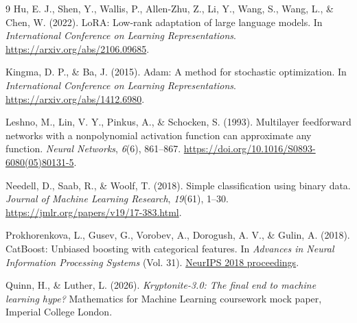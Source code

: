 \documentclass{article}
\begin{document}
\begin{thebibliography}{9}
Hu, E. J., Shen, Y., Wallis, P., Allen-Zhu, Z., Li, Y., Wang, S., Wang, L., \& Chen, W. (2022).
LoRA: Low-rank adaptation of large language models.
In \emph{International Conference on Learning Representations}.
\url{https://arxiv.org/abs/2106.09685}.

Kingma, D. P., \& Ba, J. (2015).
Adam: A method for stochastic optimization.
In \emph{International Conference on Learning Representations}.
\url{https://arxiv.org/abs/1412.6980}.

\newpage
{}
Leshno, M., Lin, V. Y., Pinkus, A., \& Schocken, S. (1993).
Multilayer feedforward networks with a nonpolynomial activation function can approximate any function.
\emph{Neural Networks}, \emph{6}(6), 861--867.
\url{https://doi.org/10.1016/S0893-6080(05)80131-5}.

Needell, D., Saab, R., \& Woolf, T. (2018).
Simple classification using binary data.
\emph{Journal of Machine Learning Research}, \emph{19}(61), 1--30.
\url{https://jmlr.org/papers/v19/17-383.html}.

Prokhorenkova, L., Gusev, G., Vorobev, A., Dorogush, A. V., \& Gulin, A. (2018).
CatBoost: Unbiased boosting with categorical features.
In \emph{Advances in Neural Information Processing Systems} (Vol. 31).
\href{https://proceedings.neurips.cc/paper/2018/hash/14491b756b3a51daac41c24863285549-Abstract.html}{NeurIPS 2018 proceedings}.

Quinn, H., \& Luther, L. (2026).
\emph{Kryptonite-3.0: The final end to machine learning hype?}
Mathematics for Machine Learning coursework mock paper, Imperial College London.
\end{thebibliography}
\end{document}
